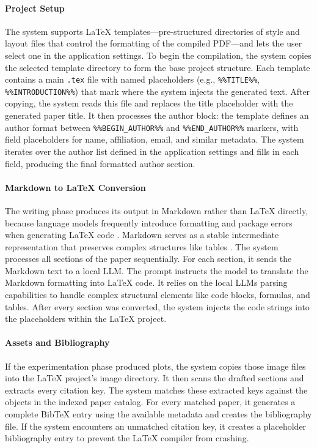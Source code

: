 \paragraph{Project Setup}
The system supports LaTeX templates---pre-structured directories of style and layout files that control the formatting of the compiled PDF---and lets the user select one in the application settings.
To begin the compilation, the system copies the selected template directory to form the base project structure.
Each template contains a main \texttt{.tex} file with named placeholders (e.g., \texttt{\%\%TITLE\%\%}, \texttt{\%\%INTRODUCTION\%\%}) that mark where the system injects the generated text.
After copying, the system reads this file and replaces the title placeholder with the generated paper title.
It then processes the author block: the template defines an author format between \texttt{\%\%BEGIN\_AUTHOR\%\%} and \texttt{\%\%END\_AUTHOR\%\%} markers, with field placeholders for name, affiliation, email, and similar metadata.
The system iterates over the author list defined in the application settings and fills in each field, producing the final formatted author section.

\paragraph{Markdown to LaTeX Conversion}
The writing phase produces its output in Markdown rather than LaTeX directly, because language models frequently introduce formatting and package errors when generating LaTeX code \cite{Kale2025TeXpertAM}.
Markdown serves as a stable intermediate representation that preserves complex structures like tables \cite{Tan2025FineTuningVM}.
The system processes all sections of the paper sequentially.
For each section, it sends the Markdown text to a local LLM.
The prompt instructs the model to translate the Markdown formatting into \LaTeX{} code.
It relies on the local LLMs parsing capabilities to handle complex structural elements like code blocks, formulas, and tables.
After every section was converted, the system injects the code strings into the placeholders within the \LaTeX{} project.

\paragraph{Assets and Bibliography}
If the experimentation phase produced plots, the system copies those image files into the \LaTeX{} project's image directory.
It then scans the drafted sections and extracts every citation key.
The system matches these extracted keys against the objects in the indexed paper catalog.
For every matched paper, it generates a complete BibTeX entry using the available metadata and creates the bibliography file.
If the system encounters an unmatched citation key, it creates a placeholder bibliography entry to prevent the LaTeX compiler from crashing.

